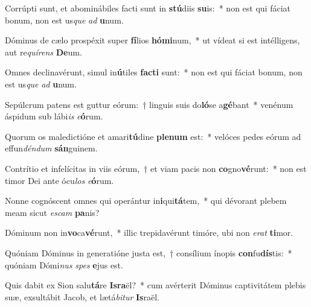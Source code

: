 \item Corrúpti sunt, et abominábiles facti sunt in \textbf{stú}diis \textbf{su}is:~* non est qui fáciat bonum, non est us\textit{que} \textit{ad} \textbf{u}num.
\item Dóminus de cælo prospéxit super \textbf{fí}lios \textbf{hó}\textbf{mi}num,~* ut vídeat si est intélligens, aut re\textit{quí}\textit{rens} \textbf{De}um.
\item Omnes declinavérunt, simul in\textbf{ú}tiles \textbf{fac}\textbf{ti} sunt:~* non est qui fáciat bonum, non est us\textit{que} \textit{ad} \textbf{u}num.
\item Sepúlcrum patens est guttur eórum:~† linguis suis do\textbf{ló}se a\textbf{gé}bant~* venénum áspidum sub lábi\textit{is} \textit{e}\textbf{ó}rum.
\item Quorum os maledictióne et amari\textbf{tú}dine \textbf{ple}\textbf{num} est:~* velóces pedes eórum ad effun\textit{dén}\textit{dum} \textbf{sán}guinem.
\item Contrítio et infelícitas in viis eórum,~† et viam pacis non \textbf{co}gno\textbf{vé}runt:~* non est timor Dei ante ócu\textit{los} \textit{e}\textbf{ó}rum.
\item Nonne cognóscent omnes qui operántur in\textbf{i}qui\textbf{tá}tem,~* qui dévorant plebem meam sicut \textit{es}\textit{cam} \textbf{pa}nis?
\item Dóminum non in\textbf{vo}ca\textbf{vé}runt,~* illic trepidavérunt timóre, ubi non \textit{e}\textit{rat} \textbf{ti}mor.
\item Quóniam Dóminus in generatióne justa est,~† consílium ínopis \textbf{con}fu\textbf{dís}tis:~* quóniam Dómi\textit{nus} \textit{spes} \textbf{e}jus est.
\item Quis dabit ex Sion salu\textbf{tá}re \textbf{Is}\textbf{ra}ël?~* cum avérterit Dóminus captivitátem plebis suæ, exsultábit Jacob, et lætá\textit{bi}\textit{tur} \textbf{Is}raël.
